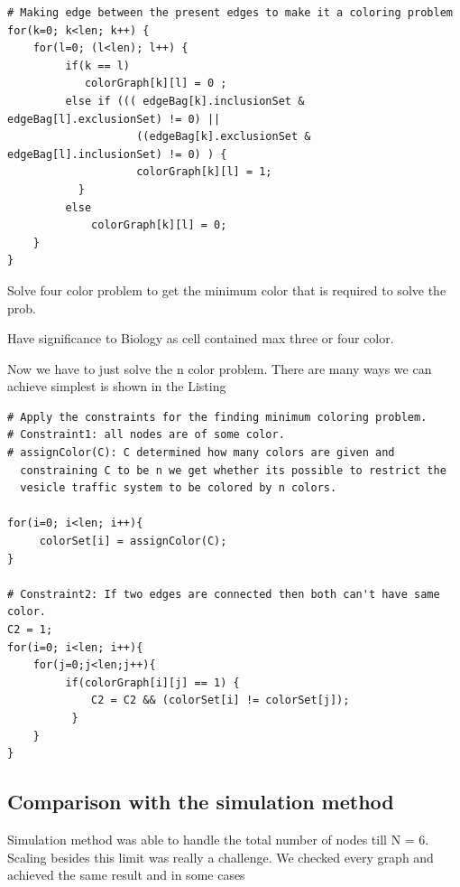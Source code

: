 \documentclass[preprint,12pt]{elsarticle}
\begin{document}
\begin{lstlisting}[mathescape,
  breaklines,
  frame=single,
  caption= \textbf{Reducing the mask problem to n-color problem.}
]
# Making edge between the present edges to make it a coloring problem
for(k=0; k<len; k++) {
    for(l=0; (l<len); l++) {
         if(k == l) 
            colorGraph[k][l] = 0 ;
         else if ((( edgeBag[k].inclusionSet & edgeBag[l].exclusionSet) != 0) ||
                    ((edgeBag[k].exclusionSet & edgeBag[l].inclusionSet) != 0) ) {
                    colorGraph[k][l] = 1;
		   }
		 else 
			 colorGraph[k][l] = 0; 
    }
}
\end{lstlisting}

Solve four color problem to get the minimum color that is required to solve the prob.  

Have significance to Biology as cell contained max three or four color. 
     
     
Now we have to just solve the n color problem. There are many ways we can achieve simplest is shown in the Listing 
\begin{lstlisting}[mathescape,
  breaklines,
  frame=single,
  caption= \textbf{Necessary condition property.}
]
# Apply the constraints for the finding minimum coloring problem.
# Constraint1: all nodes are of some color.
# assignColor(C): C determined how many colors are given and 
  constraining C to be n we get whether its possible to restrict the 
  vesicle traffic system to be colored by n colors.
                   
for(i=0; i<len; i++){
     colorSet[i] = assignColor(C);
}

# Constraint2: If two edges are connected then both can't have same color.
C2 = 1;
for(i=0; i<len; i++){
	for(j=0;j<len;j++){
	     if(colorGraph[i][j] == 1) {
             C2 = C2 && (colorSet[i] != colorSet[j]); 
          }
    }
}
\end{lstlisting}

\subsection{Comparison with the simulation method}
Simulation method was able to handle the total number of nodes till N = 6. Scaling besides this limit was really a challenge. We checked every graph and achieved the same result and in some cases  
\end{document}
